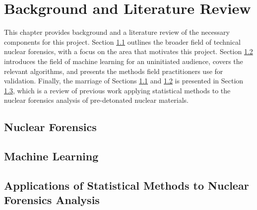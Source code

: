 \chapter{Background and Literature Review}
\label{ch:litrev}

This chapter provides background and a literature review of the necessary
components for this project. Section \ref{sec:nfoverview} outlines the broader
field of technical nuclear forensics, with a focus on the area that motivates
this project.  Section \ref{sec:mlback} introduces the field of machine
learning for an uninitiated audience, covers the relevant algorithms, and
presents the methods field practitioners use for validation.  Finally, the
marriage of Sections \ref{sec:nfoverview} and \ref{sec:mlback} is presented in
Section \ref{sec:stats4nf}, which is a review of previous work applying
statistical methods to the nuclear forensics analysis of pre-detonated nuclear
materials. 

\section{Nuclear Forensics}
\label{sec:nfoverview}


\section{Machine Learning}
\label{sec:mlback}


\section{Applications of Statistical Methods to Nuclear Forensics Analysis}
\label{sec:stats4nf}


